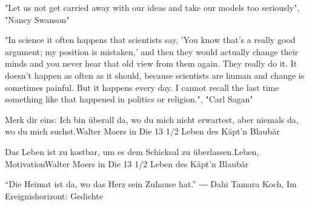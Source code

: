 "Let us not get carried away with our ideas and take our models too seriously",
          "Nancy Swanson"


"In science it often happens that scientists say, 'You know that's a really good argument; my position is mistaken,' and then they would actually change their minds and you never hear that old view from them again. They really do it. It doesn't happen as often as it should, because scientists are human and change is sometimes painful. But it happens every day. I cannot recall the last time something like that happened in politics or religion.",
          "Carl Sagan"
          
Merk dir eins: Ich bin überall da, wo du mich nicht erwartest, aber niemals da, wo du mich suchst.Walter Moers in Die 13 1/2 Leben des Käpt'n Blaubär 

Das Leben ist zu kostbar, um es dem Schicksal zu überlassen.Leben, MotivationWalter Moers in Die 13 1/2 Leben des Käpt'n Blaubär

“Die Heimat ist da, wo das Herz sein Zuhause hat.”
― Dahi Tamara Koch, Im Ereignishorizont: Gedichte 